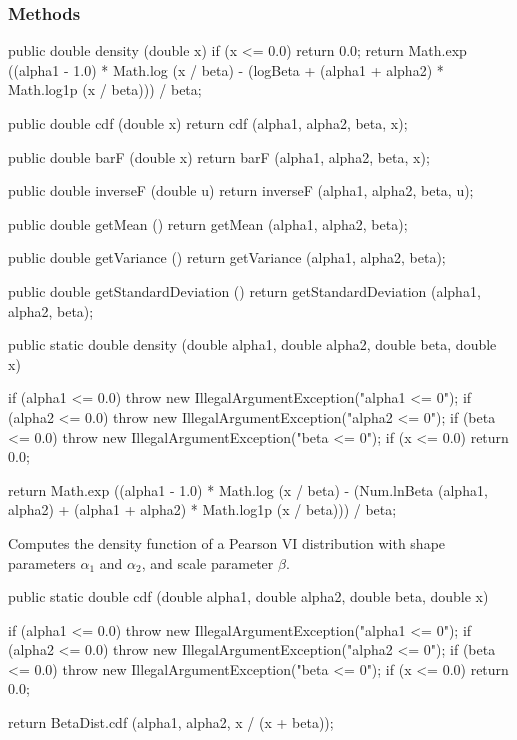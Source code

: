 \subsubsection* {Methods}
\begin{code}\begin{hide}

   public double density (double x) {
      if (x <= 0.0)
         return 0.0;
      return Math.exp ((alpha1 - 1.0) * Math.log (x / beta) - (logBeta +
            (alpha1 + alpha2) * Math.log1p (x / beta))) / beta;
   }

   public double cdf (double x) {
      return cdf (alpha1, alpha2, beta, x);
   }

   public double barF (double x) {
      return barF (alpha1, alpha2, beta, x);
   }

   public double inverseF (double u) {
      return inverseF (alpha1, alpha2, beta, u);
   }

   public double getMean () {
      return getMean (alpha1, alpha2, beta);
   }

   public double getVariance () {
      return getVariance (alpha1, alpha2, beta);
   }

   public double getStandardDeviation () {
      return getStandardDeviation (alpha1, alpha2, beta);
   }\end{hide}

   public static double density (double alpha1, double alpha2,
                                 double beta, double x)\begin{hide} {
      if (alpha1 <= 0.0)
         throw new IllegalArgumentException("alpha1 <= 0");
      if (alpha2 <= 0.0)
         throw new IllegalArgumentException("alpha2 <= 0");
      if (beta <= 0.0)
         throw new IllegalArgumentException("beta <= 0");
      if (x <= 0.0)
         return 0.0;

      return Math.exp ((alpha1 - 1.0) * Math.log (x / beta) -
         (Num.lnBeta (alpha1, alpha2) + (alpha1 + alpha2) * Math.log1p (x / beta))) / beta;
   }\end{hide}
\end{code}
\begin{tabb}
   Computes the density function of a Pearson VI distribution with shape
parameters $\alpha_1$
   and $\alpha_2$, and scale parameter $\beta$.
\end{tabb}
\begin{code}

   public static double cdf (double alpha1, double alpha2,
                             double beta, double x)\begin{hide} {
      if (alpha1 <= 0.0)
         throw new IllegalArgumentException("alpha1 <= 0");
      if (alpha2 <= 0.0)
         throw new IllegalArgumentException("alpha2 <= 0");
      if (beta <= 0.0)
         throw new IllegalArgumentException("beta <= 0");
      if (x <= 0.0)
         return 0.0;

      return BetaDist.cdf (alpha1, alpha2, x / (x + beta));
   }\end{hide}
\end{code}
